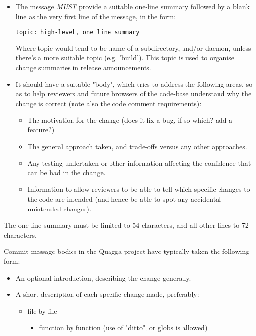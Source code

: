 \documentclass[oneside]{article}
\begin{document}
\begin{itemize}

\item The message \emph{MUST} provide a suitable one-line summary followed
      by a blank line as the very first line of the message, in the form:

  \verb|topic: high-level, one line summary|

  Where topic would tend to be name of a subdirectory, and/or daemon, unless
  there's a more suitable topic (e.g.  'build').  This topic is used to
  organise change summaries in release announcements.

\item It should have a suitable "body", which tries  to address the
      following areas, so as to help reviewers and future browsers of the
      code-base understand why the change is correct (note also the code
      comment requirements):

  \begin{itemize}
  
  \item The motivation for the change (does it fix a bug, if so which? 
        add a feature?)
  
  \item The general approach taken, and trade-offs versus any other
        approaches.
  
  \item Any testing undertaken or other information affecting the confidence
        that can be had in the change.
  
  \item Information to allow reviewers to be able to tell which specific
        changes to the code are intended (and hence be able to spot any accidental
        unintended changes).

  \end{itemize}
\end{itemize}

The one-line summary must be limited to 54 characters, and all other
lines to 72 characters.

Commit message bodies in the Quagga project have typically taken the
following form:

\begin{itemize}
\item An optional introduction, describing the change generally.
\item A short description of each specific change made, preferably:
  \begin{itemize} \item file by file
    \begin{itemize} \item function by function (use of "ditto", or globs is
                          allowed)
    \end{itemize}
  \end{itemize}
\end{itemize}
\end{document}
